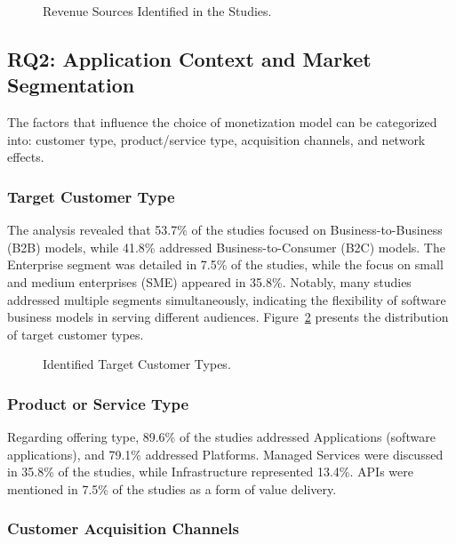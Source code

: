 \documentclass[journal]{IEEEtran}
\begin{document}
\begin{figure}[!htb]
    \centering
    
    \caption{Revenue Sources Identified in the Studies.}
    \label{fig:revenue-sources}
\end{figure}

\subsection{RQ2: Application Context and Market Segmentation}

The factors that influence the choice of monetization model can be categorized into: customer type, product/service type, acquisition channels, and network effects.

\subsubsection{Target Customer Type}

The analysis revealed that 53.7\% of the studies focused on Business-to-Business (B2B) models, while 41.8\% addressed Business-to-Consumer (B2C) models. The Enterprise segment was detailed in 7.5\% of the studies, while the focus on small and medium enterprises (SME) appeared in 35.8\%. Notably, many studies addressed multiple segments simultaneously, indicating the flexibility of software business models in serving different audiences. Figure~\ref{fig:customer-types} presents the distribution of target customer types.

\begin{figure}[!htb]
    \centering
    
    \caption{Identified Target Customer Types.}
    \label{fig:customer-types}
\end{figure}

\subsubsection{Product or Service Type}

Regarding offering type, 89.6\% of the studies addressed Applications (software applications), and 79.1\% addressed Platforms. Managed Services were discussed in 35.8\% of the studies, while Infrastructure represented 13.4\%. APIs were mentioned in 7.5\% of the studies as a form of value delivery.

\subsubsection{Customer Acquisition Channels}
\end{document}
